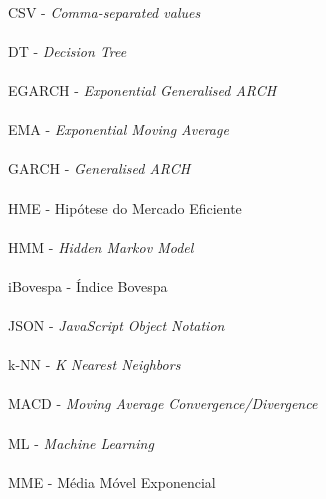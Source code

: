 \paragraph{}CSV - \textit{Comma-separated values}
\paragraph{}DT - \textit{Decision Tree}
\paragraph{}EGARCH - \textit{Exponential Generalised ARCH}
\paragraph{}EMA - \textit{Exponential Moving Average}
\paragraph{}GARCH - \textit{Generalised ARCH}
\paragraph{}HME - Hipótese do Mercado Eficiente
\paragraph{}HMM - \textit{Hidden Markov Model}
\paragraph{}iBovespa - Índice Bovespa
\paragraph{}JSON - \textit{JavaScript Object Notation}
\paragraph{}k-NN - \textit{K Nearest Neighbors}
\paragraph{}MACD - \textit{Moving Average Convergence/Divergence}
\paragraph{}ML - \textit{Machine Learning}
\paragraph{}MME - Média Móvel Exponencial
